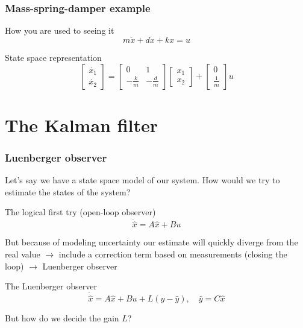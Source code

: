 \documentclass{beamer}
\begin{document}
\begin{frame}
    \frametitle{Mass-spring-damper example}

    \begin{block}{How you are used to seeing it}
        \begin{equation}
            m \ddot{x}+d \dot{x} + kx=u
        \end{equation}
    \end{block}

    \begin{block}{State space representation}
        \begin{equation}
        \left[\begin{array}{c}{{\dot{x_1}}} \\ {\dot{x_2}}\end{array}\right] =\left[\begin{array}{cc}{0} & {1} \\ {-\frac{k}{m}} & {-\frac{d}{m}}\end{array}\right] \left[\begin{array}{c}{{x_1}} \\ {x_2}\end{array}\right] +\left[\begin{array}{c}{0} \\ {\frac{1}{m}}\end{array}\right] u
        \end{equation}
    \end{block}
\end{frame}


\section{The Kalman filter}

\begin{frame}
    \frametitle{Luenberger observer}
    Let's say we have a state space model of our system. How would we try to estimate the states of the system? 

    \begin{block}{The logical first try (open-loop observer)}
        \begin{equation}
            \dot{\hat{x}} = A \hat{x} + B u 
        \end{equation}
    \end{block}

    But because of modeling uncertainty our estimate will quickly diverge from the real value $\rightarrow$ include a correction term based on measurements (closing the loop) $\rightarrow$ Luenberger observer

    \begin{block}{The Luenberger observer}
        \begin{equation}
            \dot{\hat{x}} = A \hat{x} + B u + L (y - \hat{y}), \quad \hat{y} = C \hat{x}
        \end{equation}
    \end{block}
    But how do we decide the gain $L$?
\end{frame}
\end{document}

